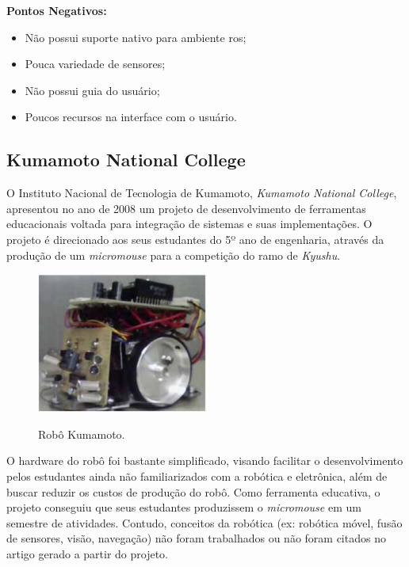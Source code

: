 \textbf{Pontos Negativos:}
\begin{itemize}
	\item Não possui suporte nativo para ambiente \gls*{ros};
	\item Pouca variedade de sensores;
	\item Não possui guia do usuário;
	\item Poucos recursos na interface com o usuário.
\end{itemize}


\subsection{Kumamoto National College}
O Instituto Nacional de Tecnologia de Kumamoto, \textit{Kumamoto National College}, apresentou no ano de 2008 um projeto de desenvolvimento de ferramentas educacionais voltada para integração de sistemas e suas implementações. O projeto é direcionado aos seus estudantes do 5º ano de engenharia, através da produção de um \textit{micromouse} para a competição do ramo de \textit{Kyushu}.

\begin{figure}[H]
	\centering
	\caption{Robô Kumamoto.}
	\includegraphics[width=0.5\textwidth]
	{Figures/Kumamoto_model.png}
	\label{fig:Kumamoto_model}
\end{figure}

O hardware do robô foi bastante simplificado, visando facilitar o desenvolvimento pelos estudantes ainda não familiarizados com a robótica e eletrônica, além de buscar reduzir os custos de produção do robô. Como ferramenta educativa, o projeto conseguiu que seus estudantes produzissem o \textit{micromouse} em um semestre de atividades. Contudo, conceitos da robótica (ex: robótica móvel, fusão de sensores, visão, navegação) não foram trabalhados ou não foram citados no artigo gerado a partir do projeto.


